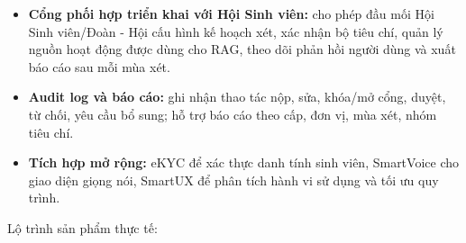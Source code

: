 \begin{itemize}
    \item \textbf{Cổng phối hợp triển khai với Hội Sinh viên:} cho phép đầu mối Hội Sinh viên/Đoàn - Hội cấu hình kế hoạch xét, xác nhận bộ tiêu chí, quản lý nguồn hoạt động được dùng cho RAG, theo dõi phản hồi người dùng và xuất báo cáo sau mỗi mùa xét.
    \item \textbf{Audit log và báo cáo:} ghi nhận thao tác nộp, sửa, khóa/mở cổng, duyệt, từ chối, yêu cầu bổ sung; hỗ trợ báo cáo theo cấp, đơn vị, mùa xét, nhóm tiêu chí.
    \item \textbf{Tích hợp mở rộng:} eKYC để xác thực danh tính sinh viên, SmartVoice cho giao diện giọng nói, SmartUX để phân tích hành vi sử dụng và tối ưu quy trình.
\end{itemize}

\noindent Lộ trình sản phẩm thực tế:

\begingroup
\small
\setlength{\tabcolsep}{4pt}
\renewcommand{\arraystretch}{1.25}

